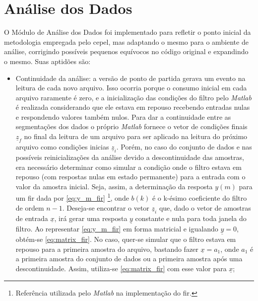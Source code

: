 \section{Análise dos Dados}
\label{sec:analise}

O Módulo de Análise dos Dados foi implementado para refletir o ponto
inicial da metodologia empregada pelo \acs{cepel}, mas adaptando o
mesmo para o ambiente de análise, corrigindo possíveis pequenos
equívocos no código original e expandindo o mesmo. Suas aptidões
são:

\begin{itemize}
\item Continuidade da análise: a versão de ponto de partida gerava
um evento na leitura de cada novo arquivo. Isso ocorria porque o
consumo inicial em cada arquivo raramente é zero, e a inicialização
das condições do filtro pelo \emph{Matlab} é realizada considerando
que ele estava em repouso recebendo entradas nulas e respondendo
valores também nulos. Para dar a continuidade entre as segmentações
dos dados o próprio \emph{Matlab} fornece o vetor de condições finais
$\underline{z}_f$ no final da leitura de um arquivo para ser aplicado
na leitura do próximo arquivo como condições inicias
$\underline{z}_i$. Porém, no caso do conjunto de dados e nas possíveis
reinicializações da análise devido a descontinuidade das amostras, era
necessário determinar como simular a condição onde o filtro estava em
repouso (com respostas nulas em estado permanente) para a entrada com
o valor da amostra inicial. Seja, assim, a determinação da resposta
$y(m)$ para um \acs{fir} dada por \ref{eq:y_m_fir}
\cite[pp.~311-312]{oppenheim}\footnote{Referência utilizada pelo
\emph{Matlab} na implementação do \acs{fir}.}, onde $b(k)$ é o k-ésimo
coeficiente do filtro de ordem $n-1$. Deseja-se encontrar o
vetor $\underline{z}_i$ que, dado o vetor de amostras de entrada
$\underline{x}$, irá gerar uma resposta $\underline{y}$ constante e
nula para toda janela do filtro. Ao representar \ref{eq:y_m_fir} em
forma matricial e igualando $\underline{y}=0$, obtém-se
\ref{eq:matrix_fir}. No caso, quer-se simular que o filtro estava em
repouso para a primeira amostra do arquivo, bastando fazer
$\underline{x}=a_1$, onde $a_1$ é a primeira amostra do conjunto de
dados ou a primeira amostra após uma descontinuidade. Assim,
utiliza-se \ref{eq:matrix_fir} com esse valor para $\underline{x}$;


\end{itemize}
